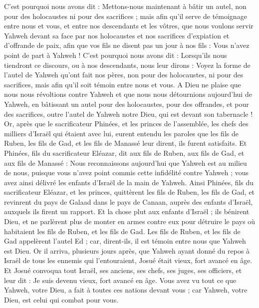 \begin{multicols}{2}
C'est pourquoi nous avons dit : Mettons-nous maintenant à bâtir un autel, non pour des holocaustes ni pour des sacrifices ;
mais afin qu'il serve de témoignage entre nous et vous, et entre nos descendants et les vôtres, que nous voulons servir Yahweh devant sa face par nos holocaustes et nos sacrifices d'expiation et d'offrande de paix, afin que vos fils ne disent pas un jour à nos fils : Vous n'avez point de part à Yahweh !
C'est pourquoi nous avons dit : Lorsqu'ils nous tiendront ce discours, ou à nos descendants, nous leur dirons : Voyez la forme de l'autel de Yahweh qu'ont fait nos pères, non pour des holocaustes, ni pour des sacrifices, mais afin qu'il soit témoin entre nous et vous.
A Dieu ne plaise que nous nous révoltions contre Yahweh et que nous nous détournions aujourd'hui de Yahweh, en bâtissant un autel pour des holocaustes, pour des offrandes, et pour des sacrifices, outre l'autel de Yahweh notre Dieu, qui est devant son tabernacle !
Or, après que le sacrificateur Phinées, et les princes de l'assemblée, les chefs des milliers d'Israël qui étaient avec lui, eurent entendu les paroles que les fils de Ruben, les fils de Gad, et les fils de Manassé leur dirent, ils furent satisfaits.
Et Phinées, fils du sacrificateur Eléazar, dit aux fils de Ruben, aux fils de Gad, et aux fils de Manassé : Nous reconnaissons aujourd'hui que Yahweh est au milieu de nous, puisque vous n'avez point commis cette infidélité contre Yahweh ; vous avez ainsi délivré les enfants d'Israël de la main de Yahweh.
Ainsi Phinées, fils du sacrificateur Eléazar, et les princes, quittèrent les fils de Ruben, les fils de Gad, et revinrent du pays de Galaad dans le pays de Canaan, auprès des enfants d'Israël, auxquels ils firent un rapport.
Et la chose plut aux enfants d'Israël ; ils bénirent Dieu, et ne parlèrent plus de monter en armes contre eux pour détruire le pays où habitaient les fils de Ruben, et les fils de Gad.
Les fils de Ruben, et les fils de Gad appelèrent l'autel Ed ; car, dirent-ils, il est témoin entre nous que Yahweh est Dieu.
\VerseOne{}Or il arriva, plusieurs jours après, que Yahweh ayant donné du repos à Israël de tous les ennemis qui l'entouraient, Josué était vieux, fort avancé en âge.
Et Josué convoqua tout Israël, ses anciens, ses chefs, ses juges, ses officiers, et leur dit : Je suis devenu vieux, fort avancé en âge.
Vous avez vu tout ce que Yahweh, votre Dieu, a fait à toutes ces nations devant vous ; car Yahweh, votre Dieu, est celui qui combat pour vous.

\end{multicols}
